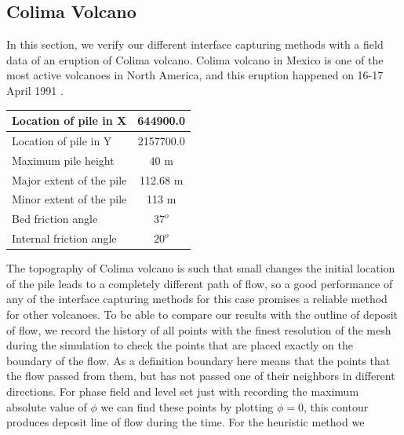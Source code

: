 \documentclass[letterpaper,10pt]{article}
\begin{document}
\subsection{Colima Volcano}
In this section, we verify our different interface capturing methods with a field data of an eruption of Colima volcano. 
Colima volcano in Mexico is one of the most active volcanoes in North America, and this eruption happened on 16-17 April 1991 \cite{Charbonnier2008}. 
\begin{center}
        \begin{tabular}{|l|c|}
                \hline
                Location of pile in X     & 644900.0 \\
                \hline
                Location of pile in Y     & 2157700.0 \\
                \hline
                Maximum pile height       & 40 m \\
                \hline
                Major extent of the pile  & 112.68 m \\
                \hline
                Minor extent of the pile  & 113 m \\
                \hline           
                Bed friction angle        & $37^o$ \\
                \hline
                Internal friction angle  & $20^o$ \\
                \hline
        \end{tabular}
\end{center}
The topography of Colima volcano is such that small changes the initial location of the pile leads to a completely different 
path of flow, so a good performance of any of the interface capturing methods for this case promises a reliable method for other volcanoes.
To be able to compare our results with the outline of deposit of flow, we record the history of all points with the finest 
resolution of the mesh during the simulation to check the points that are placed exactly on the boundary of the flow. 
As a definition boundary here means that the points that the flow passed from them, but has not passed one of their neighbors 
in different directions. For phase field and level set just with recording the maximum absolute value of $ \phi $ we can find 
these points by plotting $\phi=0$, this contour produces deposit line of flow during the time. For the heuristic method we 
\end{document}
